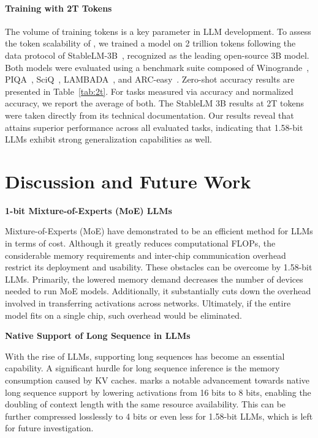 \paragraph{Training with 2T Tokens}

The volume of training tokens is a key parameter in LLM development. To assess the token scalability of , we trained a  model on 2 trillion tokens following the data protocol of StableLM-3B~\cite{StableLM-3B-4E1T}, recognized as the leading open-source 3B model. Both models were evaluated using a benchmark suite composed of Winogrande~\cite{winoGrande}, PIQA~\cite{piqa}, SciQ~\cite{sciq}, LAMBADA~\cite{lambada}, and ARC-easy~\cite{arc}. Zero-shot accuracy results are presented in Table~\ref{tab:2t}. For tasks measured via accuracy and normalized accuracy, we report the average of both. The StableLM 3B results at 2T tokens were taken directly from its technical documentation. Our results reveal that  attains superior performance across all evaluated tasks, indicating that 1.58-bit LLMs exhibit strong generalization capabilities as well.

\section{Discussion and Future Work}

\textbf{1-bit Mixture-of-Experts (MoE) LLMs}

Mixture-of-Experts (MoE) have demonstrated to be an efficient method for LLMs in terms of cost. Although it greatly reduces computational FLOPs, the considerable memory requirements and inter-chip communication overhead restrict its deployment and usability. These obstacles can be overcome by 1.58-bit LLMs. Primarily, the lowered memory demand decreases the number of devices needed to run MoE models. Additionally, it substantially cuts down the overhead involved in transferring activations across networks. Ultimately, if the entire model fits on a single chip, such overhead would be eliminated.

\textbf{Native Support of Long Sequence in LLMs}

With the rise of LLMs, supporting long sequences has become an essential capability. A significant hurdle for long sequence inference is the memory consumption caused by KV caches.  marks a notable advancement towards native long sequence support by lowering activations from 16 bits to 8 bits, enabling the doubling of context length with the same resource availability. This can be further compressed losslessly to 4 bits or even less for 1.58-bit LLMs, which is left for future investigation.

